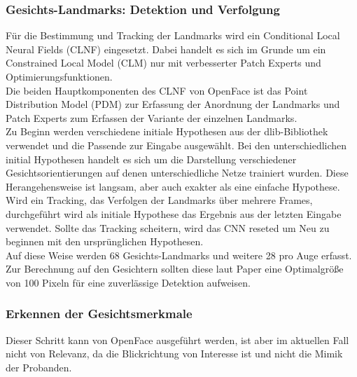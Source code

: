 \subsubsection{Gesichts-Landmarks: Detektion und Verfolgung}
Für die Bestimmung und Tracking der Landmarks wird ein Conditional Local Neural Fields (CLNF) eingesetzt. Dabei handelt es sich im Grunde um ein Constrained Local Model (CLM) nur mit verbesserter Patch Experts und Optimierungsfunktionen.\\
Die beiden Hauptkomponenten des CLNF von OpenFace ist das Point Distribution Model (PDM) zur Erfassung der Anordnung der Landmarks und Patch Experts zum Erfassen der Variante der einzelnen Landmarks.\\
Zu Beginn werden verschiedene initiale Hypothesen aus der dlib-Bibliothek verwendet und die Passende zur Eingabe ausgewählt. Bei den unterschiedlichen initial Hypothesen handelt es sich um die Darstellung verschiedener Gesichtsorientierungen auf denen unterschiedliche Netze trainiert wurden. Diese Herangehensweise ist langsam, aber auch exakter als eine einfache Hypothese. Wird ein Tracking, das Verfolgen der Landmarks über mehrere Frames, durchgeführt wird als initiale Hypothese das Ergebnis aus der letzten Eingabe verwendet. Sollte das Tracking scheitern, wird das CNN reseted um Neu zu beginnen mit den ursprünglichen Hypothesen.\\
Auf diese Weise werden 68 Gesichts-Landmarks und  weitere 28 pro Auge erfasst. Zur Berechnung auf den Gesichtern sollten diese laut Paper \cite{OpenFace} eine Optimalgröße von 100 Pixeln für eine zuverlässige Detektion aufweisen.
\subsubsection{Erkennen der Gesichtsmerkmale}
Dieser Schritt kann von OpenFace ausgeführt werden, ist aber im aktuellen Fall nicht von Relevanz, da die Blickrichtung von Interesse ist und nicht die Mimik der Probanden.
